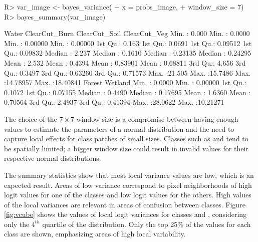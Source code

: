 \documentclass[
  shortnames]{jss}
\begin{document}
\begin{CodeChunk}
\begin{CodeInput}
R> var_image <- bayes_variance(
+     x = probs_image,
+     window_size = 7)
R> bayes_summary(var_image)
\end{CodeInput}
\begin{CodeOutput}
 Water            ClearCut_Burn     ClearCut_Soil      ClearCut_Veg      
 Min.   : 0.000   Min.   : 0.0000   Min.   : 0.00000   Min.   : 0.00000  
 1st Qu.: 0.163   1st Qu.: 0.0691   1st Qu.: 0.09512   1st Qu.: 0.09832  
 Median : 2.237   Median : 0.1610   Median : 0.23135   Median : 0.24295  
 Mean   : 2.532   Mean   : 0.4394   Mean   : 0.83901   Mean   : 0.68811  
 3rd Qu.: 4.656   3rd Qu.: 0.3497   3rd Qu.: 0.63260   3rd Qu.: 0.71573  
 Max.   :21.505   Max.   :15.7486   Max.   :14.78957   Max.   :18.40841  
 Forest            Wetland           
 Min.   : 0.0000   Min.   : 0.00000  
 1st Qu.: 0.1072   1st Qu.: 0.07155  
 Median : 0.4490   Median : 0.17695  
 Mean   : 1.6360   Mean   : 0.70564  
 3rd Qu.: 2.4937   3rd Qu.: 0.41394  
 Max.   :28.0622   Max.   :10.21271  
\end{CodeOutput}
\end{CodeChunk}

The choice of the \(7 \times 7\) window size is a compromise between having enough values to
estimate the parameters of a normal distribution and the need to capture local effects
for class patches of small sizes. Classes such as  and 
tend to be spatially limited; a bigger window size could result in invalid values for
their respective normal distributions.

The summary statistics show that most local variance values are low, which is an expected result. Areas of low variance correspond to pixel neighborhoods of high logit values for one of the classes and low logit values for the others. High values of the local variances are relevant in areas of confusion between classes. Figure \ref{fig:vcube} shows the values of local logit variances for classes  and , considering only the \(4^{th}\) quartile of the distribution. Only the top 25\% of the values for each class are shown, emphasizing areas of high local variability.
\end{document}
